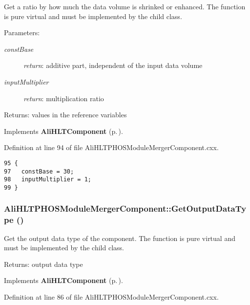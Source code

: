 Get a ratio by how much the data volume is shrinked or enhanced. The function is pure virtual and must be implemented by the child class. \begin{Desc}
\item[Parameters:]
\begin{description}
\item[{\em const\-Base}]{\em return\/}: additive part, independent of the input data volume \item[{\em input\-Multiplier}]{\em return\/}: multiplication ratio \end{description}
\end{Desc}
\begin{Desc}
\item[Returns:]values in the reference variables \end{Desc}


Implements {\bf Ali\-HLTComponent} {\rm (p.\,\pageref{classAliHLTComponent_a12})}.

Definition at line 94 of file Ali\-HLTPHOSModule\-Merger\-Component.cxx.

\footnotesize\begin{verbatim}95 {
97   constBase = 30;
98   inputMultiplier = 1;
99 }
\end{verbatim}\normalsize 


\subsubsection{ Ali\-HLTPHOSModule\-Merger\-Component::Get\-Output\-Data\-Type ()\hspace{0.3cm}{\tt  [virtual]}}\label{classAliHLTPHOSModuleMergerComponent_a12}


Get the output data type of the component. The function is pure virtual and must be implemented by the child class. \begin{Desc}
\item[Returns:]output data type \end{Desc}


Implements {\bf Ali\-HLTComponent} {\rm (p.\,\pageref{classAliHLTComponent_a11})}.

Definition at line 86 of file Ali\-HLTPHOSModule\-Merger\-Component.cxx.

